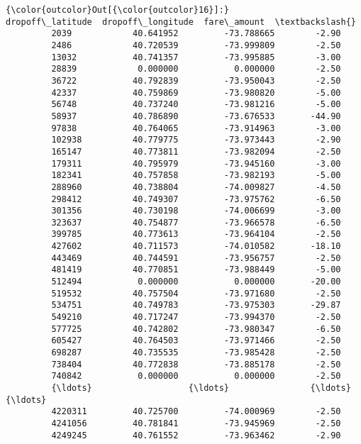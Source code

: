 \documentclass[11pt]{article}
\begin{document}
\begin{Verbatim}[commandchars=\\\{\}]
{\color{outcolor}Out[{\color{outcolor}16}]:}          dropoff\_latitude  dropoff\_longitude  fare\_amount  \textbackslash{}
         2039            40.641952         -73.788665        -2.90   
         2486            40.720539         -73.999809        -2.50   
         13032           40.741357         -73.995885        -3.00   
         28839            0.000000           0.000000        -2.50   
         36722           40.792839         -73.950043        -2.50   
         42337           40.759869         -73.980820        -5.00   
         56748           40.737240         -73.981216        -5.00   
         58937           40.786890         -73.676533       -44.90   
         97838           40.764065         -73.914963        -3.00   
         102938          40.779775         -73.973443        -2.90   
         165147          40.773811         -73.982094        -2.50   
         179311          40.795979         -73.945160        -3.00   
         182341          40.757858         -73.982193        -5.00   
         288960          40.738804         -74.009827        -4.50   
         298412          40.749307         -73.975762        -6.50   
         301356          40.730198         -74.006699        -3.00   
         323637          40.754877         -73.966578        -6.50   
         399785          40.773613         -73.964104        -2.50   
         427602          40.711573         -74.010582       -18.10   
         443469          40.744591         -73.956757        -2.50   
         481419          40.770851         -73.988449        -5.00   
         512494           0.000000           0.000000       -20.00   
         519532          40.757504         -73.971680        -2.50   
         534751          40.749783         -73.975303       -29.87   
         549210          40.717247         -73.994370        -2.50   
         577725          40.742802         -73.980347        -6.50   
         605427          40.764503         -73.971466        -2.50   
         698287          40.735535         -73.985428        -2.50   
         738404          40.772838         -73.885178        -2.50   
         740842           0.000000           0.000000        -2.50   
         {\ldots}                   {\ldots}                {\ldots}          {\ldots}   
         4220311         40.725700         -74.000969        -2.50   
         4241056         40.781841         -73.945969        -2.50   
         4249245         40.761552         -73.963462        -2.90   

\end{Verbatim}
\end{document}
